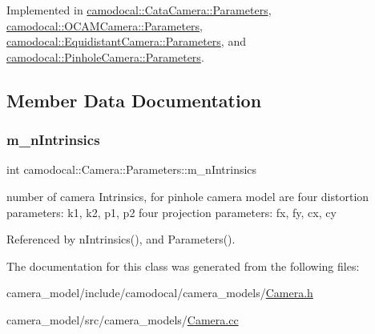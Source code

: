 Implemented in \hyperlink{classcamodocal_1_1CataCamera_1_1Parameters_a9bd3a31bc31a3f4e1becfbd2bbb43331}{camodocal\+::\+Cata\+Camera\+::\+Parameters}, \hyperlink{classcamodocal_1_1OCAMCamera_1_1Parameters_a3244c89711d0195540042c3700992827}{camodocal\+::\+O\+C\+A\+M\+Camera\+::\+Parameters}, \hyperlink{classcamodocal_1_1EquidistantCamera_1_1Parameters_afb2ad6884187c2b5e9f70f3e54e30321}{camodocal\+::\+Equidistant\+Camera\+::\+Parameters}, and \hyperlink{classcamodocal_1_1PinholeCamera_1_1Parameters_ace74203c61ef30b57a2ba21184070bb5}{camodocal\+::\+Pinhole\+Camera\+::\+Parameters}.



\subsection{Member Data Documentation}
\mbox{\label{classcamodocal_1_1Camera_1_1Parameters_a241588ca3be399d8baaeda6f663dd793}} 
\subsubsection{\texorpdfstring{m\+\_\+n\+Intrinsics}{m\_nIntrinsics}}
{\footnotesize\ttfamily int camodocal\+::\+Camera\+::\+Parameters\+::m\+\_\+n\+Intrinsics\hspace{0.3cm}{\ttfamily [protected]}}

number of camera Intrinsics, for pinhole camera model are four distortion parameters\+: k1, k2, p1, p2 four projection parameters\+: fx, fy, cx, cy 

Referenced by n\+Intrinsics(), and Parameters().



The documentation for this class was generated from the following files\+:\begin{DoxyCompactItemize}
\item 
camera\+\_\+model/include/camodocal/camera\+\_\+models/\hyperlink{Camera_8h}{Camera.\+h}\item 
camera\+\_\+model/src/camera\+\_\+models/\hyperlink{Camera_8cc}{Camera.\+cc}\end{DoxyCompactItemize}
